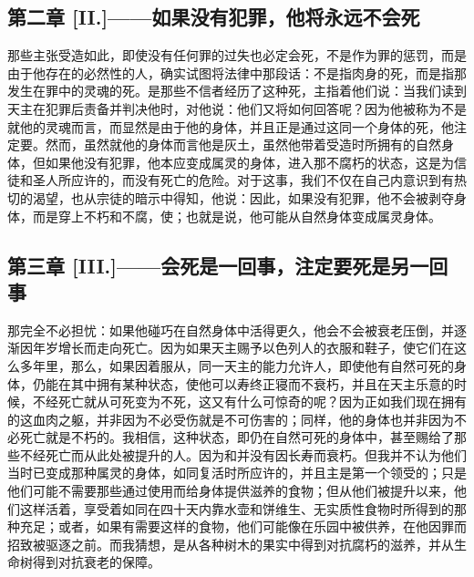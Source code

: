 
\subsection{第二章 [II.]——如果没有犯罪，他将永远不会死}

那些主张受造如此，即使没有任何罪的过失也必定会死，不是作为罪的惩罚，而是由于他存在的必然性的人，确实试图将法律中那段话：不是指肉身的死，而是指那发生在罪中的灵魂的死。是那些不信者经历了这种死，主指着他们说：当我们读到天主在犯罪后责备并判决他时，对他说：他们又将如何回答呢？因为他被称为不是就他的灵魂而言，而显然是由于他的身体，并且正是通过这同一个身体的死，他注定要。然而，虽然就他的身体而言他是灰土，虽然他带着受造时所拥有的自然身体，但如果他没有犯罪，他本应变成属灵的身体，进入那不腐朽的状态，这是为信徒和圣人所应许的，而没有死亡的危险。对于这事，我们不仅在自己内意识到有热切的渴望，也从宗徒的暗示中得知，他说：因此，如果没有犯罪，他不会被剥夺身体，而是穿上不朽和不腐，使；也就是说，他可能从自然身体变成属灵身体。\par


\subsection{第三章 [III.]——会死是一回事，注定要死是另一回事}

那完全不必担忧：如果他碰巧在自然身体中活得更久，他会不会被衰老压倒，并逐渐因年岁增长而走向死亡。因为如果天主赐予以色列人的衣服和鞋子，使它们在这么多年里，那么，如果因着服从，同一天主的能力允许人，即使他有自然可死的身体，仍能在其中拥有某种状态，使他可以寿终正寝而不衰朽，并且在天主乐意的时候，不经死亡就从可死变为不死，这又有什么可惊奇的呢？因为正如我们现在拥有的这血肉之躯，并非因为不必受伤就是不可伤害的；同样，他的身体也并非因为不必死亡就是不朽的。我相信，这种状态，即仍在自然可死的身体中，甚至赐给了那些不经死亡而从此处被提升的人。因为和并没有因长寿而衰朽。但我并不认为他们当时已变成那种属灵的身体，如同复活时所应许的，并且主是第一个领受的；只是他们可能不需要那些通过使用而给身体提供滋养的食物；但从他们被提升以来，他们这样活着，享受着如同在四十天内靠水壶和饼维生、无实质性食物时所得到的那种充足；或者，如果有需要这样的食物，他们可能像在乐园中被供养，在他因罪而招致被驱逐之前。而我猜想，是从各种树木的果实中得到对抗腐朽的滋养，并从生命树得到对抗衰老的保障。\par

